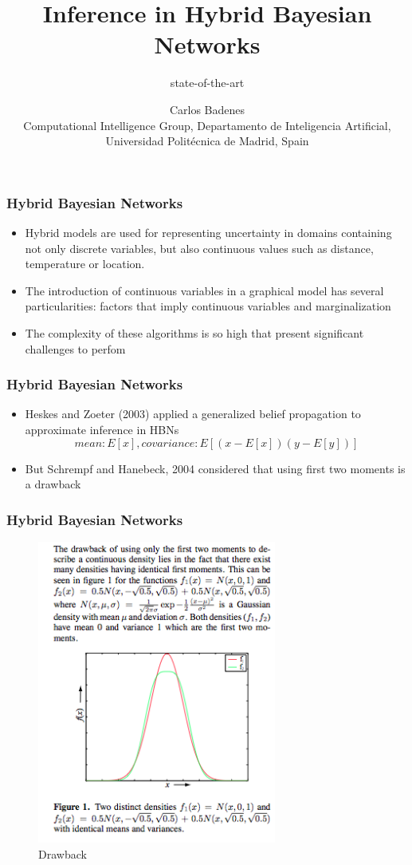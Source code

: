 \documentclass{beamer}
\title[Inference in HBNs]{Inference in Hybrid Bayesian Networks}
\subtitle{state-of-the-art}
\author[Carlos Badenes]{{Carlos Badenes}\\
{\small Computational Intelligence Group, Departamento de Inteligencia Artificial, Universidad Polit\'ecnica de Madrid, Spain}}
\date{}
\begin{document}
\frame{\titlepage}

\begin{frame}
	 \frametitle{Hybrid Bayesian Networks}
	\begin{itemize}
  	  \item Hybrid models are used for representing uncertainty in domains containing not only discrete variables, but also continuous values such as distance, temperature or location.

  	  \item The introduction of continuous variables in a graphical model has several particularities: factors that imply continuous variables and marginalization

	  \item The complexity of these algorithms is so high that present significant challenges to perfom
  	\end{itemize}
\end{frame}

\begin{frame}
	   \frametitle{Hybrid Bayesian Networks}
	\begin{itemize}
  	  \item Heskes and Zoeter (2003) applied a generalized belief propagation to approximate inference in HBNs\[
mean: E[x], covariance: E[(x-E[x])(y-E[y])]
\]	
  	  \item But Schrempf and Hanebeck, 2004 considered that using  first two moments is a drawback
  	\end{itemize} 
\end{frame}

\begin{frame}
	   \frametitle{Hybrid Bayesian Networks}
		\begin{figure}
		  	\centering
    			\includegraphics[width=0.7\textwidth]{HBM-2004.png}
  			\caption{Drawback}
		\end{figure}
\end{frame}
\end{document}
